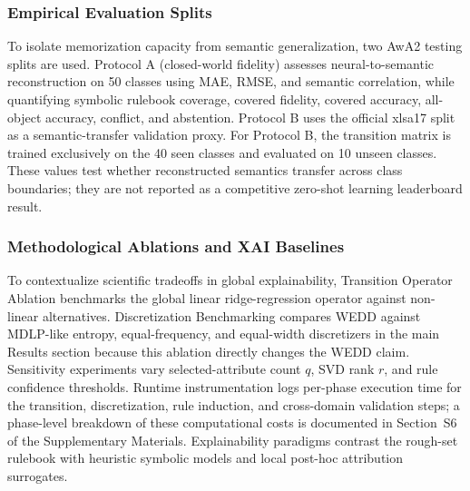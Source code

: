 \documentclass[make,article,submit,pdftex,moreauthors]{Definitions/mdpi}
\begin{document}
\subsubsection{Empirical Evaluation Splits}
\label{subsubsec:evaluation_splits}

To isolate memorization capacity from semantic generalization, two AwA2 testing splits are used. Protocol A (closed-world fidelity) assesses neural-to-semantic reconstruction on 50 classes using MAE, RMSE, and semantic correlation, while quantifying symbolic rulebook coverage, covered fidelity, covered accuracy, all-object accuracy, conflict, and abstention. Protocol B uses the official xlsa17 split as a semantic-transfer validation proxy. For Protocol B, the transition matrix is trained exclusively on the 40 seen classes and evaluated on 10 unseen classes. These values test whether reconstructed semantics transfer across class boundaries; they are not reported as a competitive zero-shot learning leaderboard result.

\subsubsection{Methodological Ablations and XAI Baselines}
\label{subsubsec:methodological_ablations}

To contextualize scientific tradeoffs in global explainability, Transition Operator Ablation benchmarks the global linear ridge-regression operator against non-linear alternatives. Discretization Benchmarking compares WEDD against MDLP-like entropy, equal-frequency, and equal-width discretizers in the main Results section because this ablation directly changes the WEDD claim. Sensitivity experiments vary selected-attribute count $q$, SVD rank $r$, and rule confidence thresholds. Runtime instrumentation logs per-phase execution time for the transition, discretization, rule induction, and cross-domain validation steps; a phase-level breakdown of these computational costs is documented in Section~S6 of the Supplementary Materials. Explainability paradigms contrast the rough-set rulebook with heuristic symbolic models and local post-hoc attribution surrogates.
\end{document}
